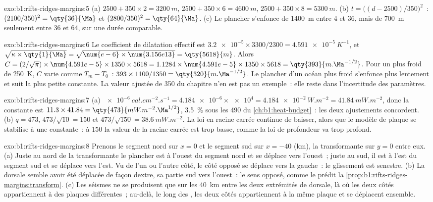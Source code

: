 \begin{solution}{exo:b1:rifts-ridges-margins:5}
(a) $2500 + 350\times2 = \qty{3200}{m}$, $2500 + 350\times6 = \qty{4600}{m}$,
$2500 + 350\times8 = \qty{5300}{m}$. (b) $t = \bigl((d - 2500)/350\bigr)^2$~:
$(2100/350)^2 = \qty{36}{\Ma}$ et $(2800/350)^2 = \qty{64}{\Ma}$. (c) Le
plancher s'enfonce de \qty{1400}{m} entre 4 et \qty{36}{\Ma}, mais de \qty{700}{m} seulement
entre 36 et \qty{64}{\Ma}, sur une durée comparable.
\end{solution}

\begin{solution}{exo:b1:rifts-ridges-margins:6}
Le coefficient de dilatation effectif est
$\num{3.2e-5}\times3300/2300 = \qty{4.591e-5}{K^{-1}}$, et
$\sqrt{\kappa\times\qty{1}{\Ma}} = \sqrt{\num{e-6}\times\num{3.156e13}} =
\qty{5618}{m}$. Alors $C = (2/\sqrt\pi)\times\num{4.591e-5}\times1350\times5618 =
1.1284\times\num{4.591e-5}\times1350\times5618 = \qty{393}{m.\Ma^{-1/2}}$. Pour un
 plus froid de \qty{250}{K}, $C$ varie comme $T_m - T_0$~:
$393\times1100/1350 = \qty{320}{m.\Ma^{-1/2}}$. Le plancher d'un océan plus froid
s'enfonce plus lentement et suit la plus petite constante. La valeur ajustée de \num{350}
du chapitre n'en est pas un exemple~: elle reste dans l'incertitude des paramètres.
\end{solution}

\begin{solution}{exo:b1:rifts-ridges-margins:7}
(a) $\qty{e-6}{cal.cm^{-2}.s^{-1}} = \num{4.184e-6}\times\num{e4} =
\qty{4.184e-2}{W.m^{-2}} = \qty{41.84}{mW.m^{-2}}$, donc la constante est
$11.3\times41.84 = \qty{473}{mW.m^{-2}.\Ma^{1/2}}$, \qty{3.5}{\percent} sous
les 490 du \cref{ch:b1:heat-budget}~: les deux ajustements concordent. (b) $q = 473$,
$473/\sqrt{10} = 150$ et $473/\sqrt{150} = \qty{38.6}{mW.m^{-2}}$. La loi en
racine carrée continue de baisser, alors que le modèle de plaque se stabilise à une constante~:
à \qty{150}{\Ma} la valeur de la racine carrée est trop basse, comme la loi de profondeur va trop
profond.
\end{solution}

\begin{solution}{exo:b1:rifts-ridges-margins:8}
Prenons le segment nord sur $x = 0$ et le segment sud sur $x = -40$
(km), la transformante sur $y = 0$ entre eux. (a) Juste au nord de la transformante le
plancher est à l'ouest du segment nord et se déplace vers l'ouest~; juste au sud, il
est à l'est du segment sud et se déplace vers l'est. Vu de l'un ou l'autre côté, le
côté opposé se déplace vers la gauche~: le glissement est senestre. (b) La
dorsale semble avoir été déplacée de façon dextre, sa partie sud vers
l'ouest~: le sens opposé, comme le prédit la \cref{prop:b1:rifts-ridges-margins:transform}.
(c) Les séismes ne se produisent que sur les \qty{40}{km} entre les deux extrémités de dorsale,
là où les deux côtés appartiennent à des plaques différentes~; au-delà, le long des
, les deux côtés appartiennent à la même plaque et se déplacent ensemble.
\end{solution}

